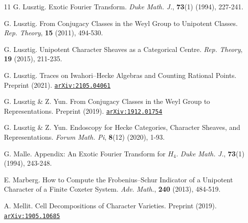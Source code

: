 \documentclass[a4paper,10pt,leqno]{amsart}
\theoremstyle{plain}
\theoremstyle{plain}
\theoremstyle{plain}
\theoremstyle{definition}
\theoremstyle{remark}
\begin{document}
\begin{thebibliography}{11}
	G. Lusztig.
	Exotic Fourier Transform.	
	\textsl{Duke Math. J.},
	\textbf{73}(1)
	(1994),
	227-241.
	
	G. Lusztig.
	From Conjugacy Classes in the Weyl Group to Unipotent Classes.
	\textsl{Rep. Theory},
	\textbf{15}
	(2011),
	494-530.
	
	G. Lusztig.
	Unipotent Character Sheaves as a Categorical Centre.
	\textsl{Rep. Theory},
	\textbf{19}
	(2015),
	211-235.
	
	
	G. Lusztig.
	Traces on Iwahori--Hecke Algebras and Counting Rational Points.
	Preprint
	(2021).
	\href{http://arxiv.org/abs/2105.04061}{\texttt{arXiv:2105.04061}}

	G. Lusztig \& Z. Yun.
	From Conjugacy Classes in the Weyl Group to Representations.
	Preprint
	(2019).
	\href{arXiv:1912.01754}{\texttt{arXiv:1912.01754}}
		
	G. Lusztig \& Z. Yun.
	Endoscopy for Hecke Categories, Character Sheaves, and Representations.
	\textsl{Forum Math. Pi},
	\textbf{8}(12)
	(2020),
	1-93.
	
	G. Malle.
	Appendix: An Exotic Fourier Transform for $H_4$.
	\textsl{Duke Math. J.},
	\textbf{73}(1)
	(1994),
	243-248.

	E. Marberg.
	How to Compute the Frobenius--Schur Indicator of a Unipotent Character of a Finite Coxeter System.
	\textsl{Adv. Math.},
	\textbf{240}
	(2013),
	484-519.
	
	A. Mellit.
	Cell Decompositions of Character Varieties.
	Preprint
	(2019).
	\href{http://www.arxiv.org/abs/1905.10685}{\texttt{arXiv:1905.10685}}
	
	

	

\end{thebibliography}
\end{document}
